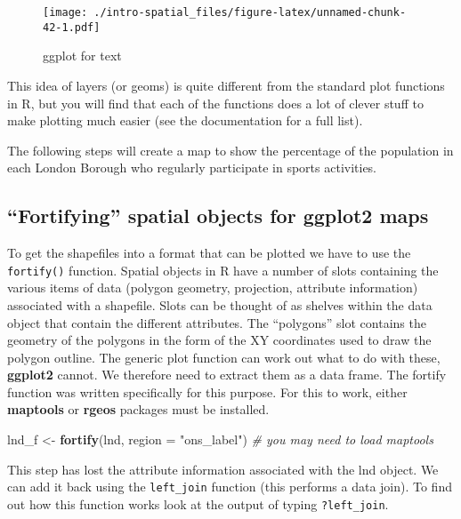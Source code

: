 \documentclass[]{article}
\newenvironment{Shaded}{}{}
\newcommand{\KeywordTok}[1]{\textcolor[rgb]{0.00,0.44,0.13}{\textbf{{#1}}}}
\newcommand{\DataTypeTok}[1]{\textcolor[rgb]{0.56,0.13,0.00}{{#1}}}
\newcommand{\StringTok}[1]{\textcolor[rgb]{0.25,0.44,0.63}{{#1}}}
\newcommand{\CommentTok}[1]{\textcolor[rgb]{0.38,0.63,0.69}{\textit{{#1}}}}
\newcommand{\NormalTok}[1]{{#1}}
\begin{document}
\begin{figure}[htbp]
\centering
\texttt{[image: ./intro-spatial\_files/figure-latex/unnamed-chunk-42-1.pdf]}
\caption{ggplot for text}
\end{figure}

This idea of layers (or geoms) is quite different from the standard plot
functions in R, but you will find that each of the functions does a lot
of clever stuff to make plotting much easier (see the documentation for
a full list).

The following steps will create a map to show the percentage of the
population in each London Borough who regularly participate in sports
activities.

\subsection{``Fortifying'' spatial objects for ggplot2
maps}\label{fortifying-spatial-objects-for-ggplot2-maps}

To get the shapefiles into a format that can be plotted we have to use
the \texttt{fortify()} function. Spatial objects in R have a number of
slots containing the various items of data (polygon geometry,
projection, attribute information) associated with a shapefile. Slots
can be thought of as shelves within the data object that contain the
different attributes. The ``polygons'' slot contains the geometry of the
polygons in the form of the XY coordinates used to draw the polygon
outline. The generic plot function can work out what to do with these,
\textbf{ggplot2} cannot. We therefore need to extract them as a data
frame. The fortify function was written specifically for this purpose.
For this to work, either \textbf{maptools} or \textbf{rgeos} packages
must be installed.

\begin{Shaded}
\begin{Highlighting}[]
\NormalTok{lnd_f <-}\StringTok{ }\KeywordTok{fortify}\NormalTok{(lnd, }\DataTypeTok{region =} \StringTok{"ons_label"}\NormalTok{) }\CommentTok{# you may need to load maptools}
\end{Highlighting}
\end{Shaded}

This step has lost the attribute information associated with the lnd
object. We can add it back using the \texttt{left\_join} function (this
performs a data join). To find out how this function works look at the
output of typing \texttt{?left\_join}.
\end{document}

